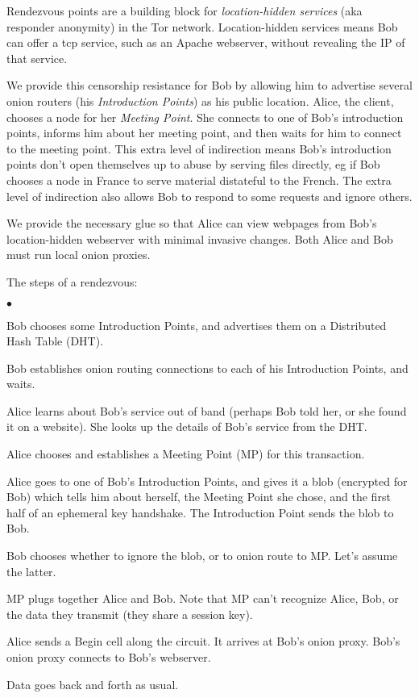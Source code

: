 \documentclass[times,10pt,twocolumn]{article}
\newenvironment{tightlist}{\begin{list}{$\bullet$}{
  \setlength{\itemsep}{0mm}
    \setlength{\parsep}{0mm}
    }}{\end{list}}
\begin{document}
\label{sec:rendezvous}

Rendezvous points are a building block for \emph{location-hidden services}
(aka responder anonymity) in the Tor network. Location-hidden
services means Bob can offer a tcp service, such as an Apache webserver,
without revealing the IP of that service.

We provide this censorship resistance for Bob by allowing him to
advertise several onion routers (his \emph{Introduction Points}) as his
public location. Alice, the client, chooses a node for her \emph{Meeting
Point}. She connects to one of Bob's introduction points, informs him
about her meeting point, and then waits for him to connect to the meeting
point. This extra level of indirection means Bob's introduction points
don't open themselves up to abuse by serving files directly, eg if Bob
chooses a node in France to serve material distateful to the French. The
extra level of indirection also allows Bob to respond to some requests
and ignore others.

We provide the necessary glue so that Alice can view webpages from Bob's
location-hidden webserver with minimal invasive changes. Both Alice and
Bob must run local onion proxies.

The steps of a rendezvous:
\begin{tightlist}
\item Bob chooses some Introduction Points, and advertises them on a
      Distributed Hash Table (DHT).
\item Bob establishes onion routing connections to each of his
      Introduction Points, and waits.
\item Alice learns about Bob's service out of band (perhaps Bob told her,
      or she found it on a website). She looks up the details of Bob's
      service from the DHT.
\item Alice chooses and establishes a Meeting Point (MP) for this
      transaction.
\item Alice goes to one of Bob's Introduction Points, and gives it a blob
      (encrypted for Bob) which tells him about herself, the Meeting Point
      she chose, and the first half of an ephemeral key handshake. The
      Introduction Point sends the blob to Bob.
\item Bob chooses whether to ignore the blob, or to onion route to MP.
      Let's assume the latter.
\item MP plugs together Alice and Bob. Note that MP can't recognize Alice,
      Bob, or the data they transmit (they share a session key).
\item Alice sends a Begin cell along the circuit. It arrives at Bob's
      onion proxy. Bob's onion proxy connects to Bob's webserver.
\item Data goes back and forth as usual.
\end{tightlist}
\end{document}

